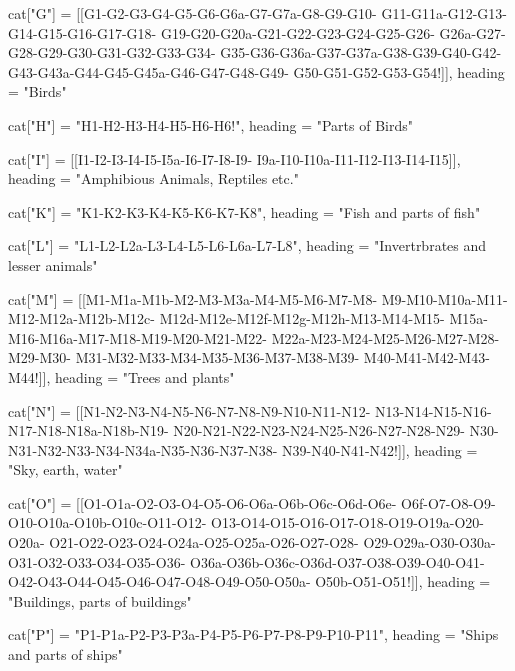 cat["G"]  =   {[[G1-G2-G3-G4-G5-G6-G6a-G7-G7a-G8-G9-G10-
                 G11-G11a-G12-G13-G14-G15-G16-G17-G18-
                 G19-G20-G20a-G21-G22-G23-G24-G25-G26-
                 G26a-G27-G28-G29-G30-G31-G32-G33-G34-
                 G35-G36-G36a-G37-G37a-G38-G39-G40-G42-
                 G43-G43a-G44-G45-G45a-G46-G47-G48-G49-
                 G50-G51-G52-G53-G54!]],
                 heading = "Birds"}

cat["H"]   =   {"H1-H2-H3-H4-H5-H6-H6!",
                   heading = "Parts of Birds"}

cat["I"]   =   {[[I1-I2-I3-I4-I5-I5a-I6-I7-I8-I9-
                   I9a-I10-I10a-I11-I12-I13-I14-I15]],
                   heading = "Amphibious Animals, Reptiles etc."}

cat["K"]   =   {"K1-K2-K3-K4-K5-K6-K7-K8",
                   heading = "Fish and parts of fish"}

cat["L"]   =   {"L1-L2-L2a-L3-L4-L5-L6-L6a-L7-L8",
                   heading = "Invertrbrates and lesser animals"}

cat["M"]   =   {[[M1-M1a-M1b-M2-M3-M3a-M4-M5-M6-M7-M8-
                 M9-M10-M10a-M11-M12-M12a-M12b-M12c-
                 M12d-M12e-M12f-M12g-M12h-M13-M14-M15-
                 M15a-M16-M16a-M17-M18-M19-M20-M21-M22-
                 M22a-M23-M24-M25-M26-M27-M28-M29-M30-
                 M31-M32-M33-M34-M35-M36-M37-M38-M39-
                 M40-M41-M42-M43-M44!]],
                 heading = "Trees and plants"}

cat["N"] =     {[[N1-N2-N3-N4-N5-N6-N7-N8-N9-N10-N11-N12-
                 N13-N14-N15-N16-N17-N18-N18a-N18b-N19-
    N20-N21-N22-N23-N24-N25-N26-N27-N28-N29-
                 N30-N31-N32-N33-N34-N34a-N35-N36-N37-N38-
                 N39-N40-N41-N42!]],
                 heading = "Sky, earth, water"}

cat["O"] =    {[[O1-O1a-O2-O3-O4-O5-O6-O6a-O6b-O6c-O6d-O6e-
                  O6f-O7-O8-O9-O10-O10a-O10b-O10c-O11-O12-
                  O13-O14-O15-O16-O17-O18-O19-O19a-O20-O20a-
                  O21-O22-O23-O24-O24a-O25-O25a-O26-O27-O28-
                  O29-O29a-O30-O30a-O31-O32-O33-O34-O35-O36-
                  O36a-O36b-O36c-O36d-O37-O38-O39-O40-O41-
                  O42-O43-O44-O45-O46-O47-O48-O49-O50-O50a-
                  O50b-O51-O51!]],
                  heading = "Buildings, parts of buildings"}

cat["P"]   =   {"P1-P1a-P2-P3-P3a-P4-P5-P6-P7-P8-P9-P10-P11",
                heading = "Ships and parts of ships"}

